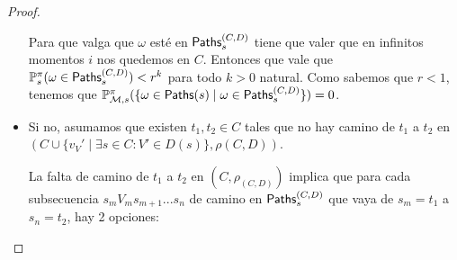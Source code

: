 \begin{proof}
\begin{itemize}
		      Para que valga que $\omega$ esté en $\textsf{Paths}_s^{(C,D)}$ tiene que valer que en
		      infinitos momentos $i$ nos quedemos en $C$. Entonces que vale que $\mathbb{P}_s^\pi
			      (\omega \in \textsf{Paths}_s^{(C,D)}) < r^k$ para todo $k > 0$ natural. Como sabemos
		      que $r < 1$, tenemos que $\mathbb{P}^\pi_{\mathcal{M}, s}(\{ \omega \in \textsf{Paths}(s) \mid \omega
			      \in \textsf{Paths}_s^{(C,D)}\}) = 0$.








		\item Si no, asumamos que existen $t_1, t_2 \in C$ tales que no hay camino de $t_1$ a
		      $t_2$ en $(C \cup \{v_V' \mid \exists s \in C : V' \in D(s)\}, \rho(C,D))$.

		      La falta de camino de $t_1$ a $t_2$ en $(C, \rho_{(C,D)})$ implica que para
		      cada subsecuencia $s_m V_m s_{m+1} ... s_n$ de camino en $\textsf{Paths}_s^{(C,D)}$ que
		      vaya de $s_m=t_1$ a $s_n=t_2$, hay 2 opciones:


\end{itemize}
\end{proof}
